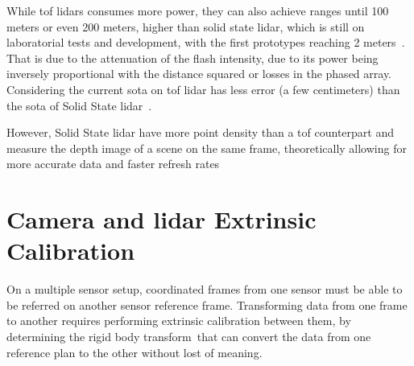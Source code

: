 While \ac{tof} \acp{lidar} consumes more power, they can also achieve ranges until 100 meters \cite{vlp16, Sullivan2016} or even 200 meters\cite{VelodyneHDL64, Sullivan2016}, higher than solid state \ac{lidar}, which is still on laboratorial tests and development, with the first prototypes reaching 2 meters~\cite{Hecht2018}. That is due to the attenuation of the flash intensity, due to its power being inversely proportional with the distance squared or losses in the phased array. Considering the current \ac{sota} on \ac{tof} \ac{lidar} has less error (a few centimeters) than the \ac{sota} of Solid State \ac{lidar}~\cite{Hecht2018, Fersch2017a}.

However, Solid State \ac{lidar} have more point density than a \ac{tof} counterpart and measure the depth image of a scene on the same frame, theoretically allowing for more accurate data and faster refresh rates\cite{Sullivan2016, Hecht2018, Fersch2017a}






\section{Camera and \ac{lidar} Extrinsic Calibration}
\label{sec:sota:extrinsic_calibration}

On a multiple sensor setup, coordinated frames from one sensor must be able to be referred on another sensor reference frame. Transforming data from one frame to another requires performing extrinsic calibration between them, by determining the rigid body transform~\citeneeded that can convert the data from one reference plan to the other without lost of meaning. 

